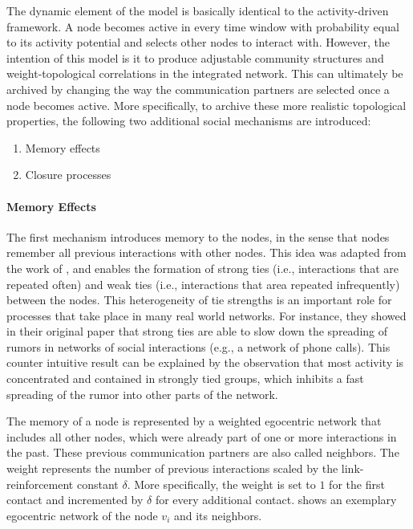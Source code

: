 The dynamic element of the model is basically identical to the activity-driven framework.
A node becomes active in every time window with probability equal to its activity potential and selects other nodes to interact with.
However, the intention of this model is it to produce adjustable community structures and weight-topological correlations in the integrated network.
This can ultimately be archived by changing the way the communication partners are selected once a node becomes active.
More specifically, to archive these more realistic topological properties, the following two additional social mechanisms are introduced:

\begin{enumerate}
    \item Memory effects
    \item Closure processes
\end{enumerate}


\paragraph{Memory Effects}
The first mechanism introduces memory to the nodes, in the sense that nodes remember all previous interactions with other nodes.
This idea was adapted from the work of \citet{Karsai2014}, and enables the formation of strong ties (i.e., interactions that are repeated often) and weak ties (i.e., interactions that area repeated infrequently) between the nodes.
This heterogeneity of tie strengths is an important role for processes that take place in many real world networks.
For instance, they showed in their original paper that strong ties are able to slow down the spreading of rumors in networks of social interactions (e.g., a network of phone calls).
This counter intuitive result can be explained by the observation that most activity is concentrated and contained in strongly tied groups, which inhibits a fast spreading of the rumor into other parts of the network.

The memory of a node is represented by a weighted egocentric network that includes all other nodes, which were already part of one or more interactions in the past.
These previous communication partners are also called neighbors.
The weight represents the number of previous interactions scaled by the link-reinforcement constant \( \delta \).
More specifically, the weight is set to \( 1 \) for the first contact and incremented by \( \delta \) for every additional contact.
 shows an exemplary egocentric network of the node \( v_{i} \) and its neighbors.


